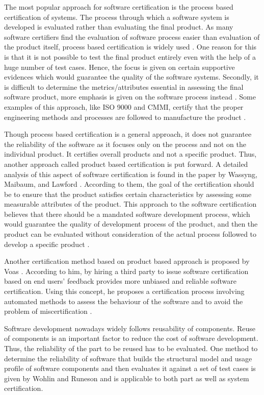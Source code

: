 \documentclass[11pt,letterpaper]{report}
\begin{document}
The most popular approach for software certification is the process based certification of systems. The process through which a software system is developed is evaluated rather than evaluating the final product. As many software certifiers find the evaluation of software process easier than evaluation of the product itself, process based certification is widely used \cite{Lawford}. One reason for this is that it is not possible to test the final product entirely even with the help of a huge number of test cases. Hence, the focus is given on certain supportive evidences which would guarantee the quality of the software systems. Secondly, it is difficult to determine the metrics/attributes essential in assessing the final software product, more emphasis is given on the software process instead \cite{Lawford}. Some examples of this approach, like ISO 9000 and CMMI, certify that the proper engineering methods and processes are followed to manufacture the product \cite{Voas}.

Though process based certification is a general approach, it does not guarantee the reliability of the software as it focuses only on the process and not on the individual product. It certifies overall products and not a specific product. Thus, another approach called product based certification is put forward. A detailed analysis of this aspect of software certification is found in the paper by Wassyng, Maibaum, and Lawford \cite{Lawford}. According to them, the goal of the certification should be to ensure that the product satisfies certain characteristics by assessing some measurable attributes of the product. This approach to the software certification believes that there should be a mandated software development process, which would guarantee the quality of development process of the product, and then the product can be evaluated without consideration of the actual process followed to develop a specific product \cite{Lawford}.

Another certification method based on product based approach is proposed by Voas \cite{Voas}. According to him, by hiring a third party to issue software certification based on end users' feedback provides more unbiased and reliable software certification. Using this concept, he proposes a certification process involving automated methods to assess the behaviour of the software and to avoid the problem of miscertification \cite{Voas}.

Software development nowadays widely follows reusability of components. Reuse of components is an important factor to reduce the cost of software development. Thus, the reliability of the part to be reused has to be evaluated. One method to determine the reliability of software that builds the structural model and usage profile of software components and then evaluates it against a set of test cases is given by Wohlin and Runeson \cite{CSC} and is applicable to both part as well as system certification.
\end{document}
